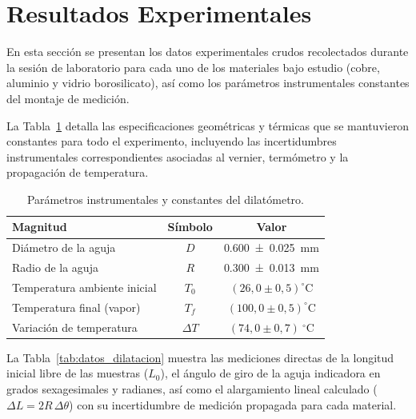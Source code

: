 
    \section{Resultados Experimentales}
    \label{sec:resultados}

    En esta sección se presentan los datos experimentales crudos recolectados durante la sesión de laboratorio para cada uno de los materiales bajo estudio (cobre, aluminio y vidrio borosilicato), así como los parámetros instrumentales constantes del montaje de medición.

    La Tabla~\ref{tab:parametros_sistema} detalla las especificaciones geométricas y térmicas que se mantuvieron constantes para todo el experimento, incluyendo las incertidumbres instrumentales correspondientes asociadas al vernier, termómetro y la propagación de temperatura.

    \begin{table}[H]
        \centering
        \caption{Parámetros instrumentales y constantes del dilatómetro.}
        \label{tab:parametros_sistema}
        \begin{tabular}{lcc}
            \toprule
            \textbf{Magnitud} & \textbf{Símbolo} & \textbf{Valor} \\
            \midrule
            Diámetro de la aguja & $D$ & \qty{0,600 \pm 0,025}{\milli\meter} \\
            Radio de la aguja & $R$ & \qty{0,300 \pm 0,013}{\milli\meter} \\
            Temperatura ambiente inicial & $T_0$ & $(26,0 \pm 0,5)^\circ$C \\
            Temperatura final (vapor) & $T_f$ & $(100,0 \pm 0,5)^\circ$C \\
            Variación de temperatura & $\Delta T$ & $(74,0 \pm 0,7)\ ^\circ\text{C}$ \\
            \bottomrule 
        \end{tabular}
    \end{table}

    La Tabla~\ref{tab:datos_dilatacion} muestra las mediciones directas de la longitud inicial libre de las muestras ($L_0$), el ángulo de giro de la aguja indicadora en grados sexagesimales y radianes, así como el alargamiento lineal calculado ($\Delta L = 2R\,\Delta\theta$) con su incertidumbre de medición propagada para cada material.

